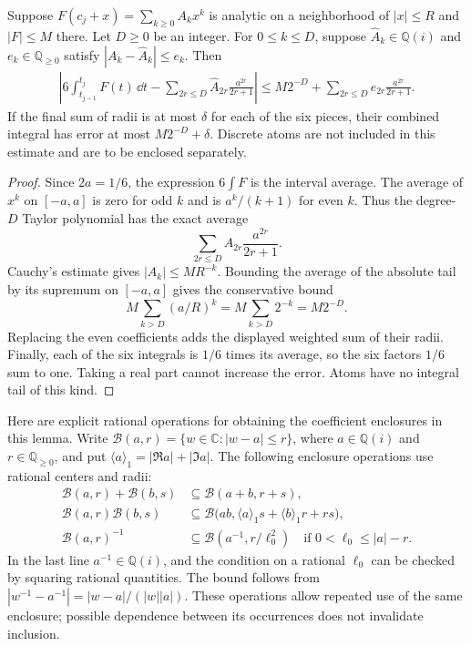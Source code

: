 \begin{lemma}
\label{ind:taylor-average}
Suppose $F(c_j+x)=\sum_{k\ge0}A_kx^k$ is analytic on a neighborhood of
$|x|\le R$ and $|F|\le M$ there.  Let $D\ge0$ be an integer.  For
$0\le k\le D$, suppose
$\widehat A_k\in\mathbb Q(i)$ and $e_k\in\mathbb Q_{\ge0}$ satisfy
$|A_k-\widehat A_k|\le e_k$.  Then
\begin{align}\label{ind:taylor-average-error}
 \left|6\int_{t_{j-1}}^{t_j}F(t)\,\dd t-
       \sum_{2r\le D}\widehat A_{2r}\frac{a^{2r}}{2r+1}\right|
 \le M2^{-D}+\sum_{2r\le D}e_{2r}\frac{a^{2r}}{2r+1}.
\end{align}
If the final sum of radii is at most $\delta$ for each of the six pieces,
their combined integral has error at most $M2^{-D}+\delta$.  Discrete
atoms are not included in this estimate and are to be enclosed separately.
\end{lemma}

\begin{proof}
Since $2a=1/6$, the expression $6\int F$ is the interval average.  The
average of $x^k$ on $[-a,a]$ is zero for odd $k$ and is $a^k/(k+1)$ for
even $k$.  Thus the degree-$D$ Taylor polynomial has the exact average
\begin{equation}\label{ind:even-average}
 \sum_{2r\le D} A_{2r}\frac{a^{2r}}{2r+1}.
\end{equation}
Cauchy's estimate gives $|A_k|\le M R^{-k}$.  Bounding the average of the
absolute tail by its supremum on $[-a,a]$ gives the conservative bound
\[
 M\sum_{k>D}(a/R)^k=M\sum_{k>D}2^{-k}=M2^{-D}.
\]
Replacing the even coefficients adds the displayed weighted sum of their
radii.  Finally, each of the six integrals is $1/6$ times its average, so
the six factors $1/6$ sum to one.  Taking a real part cannot increase the
error.  Atoms have no integral tail of this kind.
\end{proof}

Here are explicit rational operations for obtaining the coefficient
enclosures in this lemma.  Write
$\mathcal B(a,r)=\{w\in\mathbb C:|w-a|\le r\}$, where
$a\in\mathbb Q(i)$ and $r\in\mathbb Q_{\ge0}$, and put
$\langle a\rangle_1=|\Re a|+|\Im a|$.  The following enclosure operations
use rational centers and radii:
\begin{align}\label{ind:ball-operations}
 \mathcal B(a,r)+\mathcal B(b,s)&\subseteq\mathcal B(a+b,r+s),\nonumber\\
 \mathcal B(a,r)\mathcal B(b,s)&\subseteq
 \mathcal B\bigl(ab,\langle a\rangle_1s+\langle b\rangle_1r+rs\bigr),\nonumber\\
 \mathcal B(a,r)^{-1}&\subseteq\mathcal B(a^{-1},r/\ell_0^2)
 \quad\text{if }0<\ell_0\le |a|-r.
\end{align}
In the last line $a^{-1}\in\mathbb Q(i)$, and the condition on a rational
$\ell_0$ can be checked by squaring rational quantities.  The bound follows
from $|w^{-1}-a^{-1}|=|w-a|/(|w||a|)$.  These operations allow repeated
use of the same enclosure; possible dependence between its occurrences
does not invalidate inclusion.

